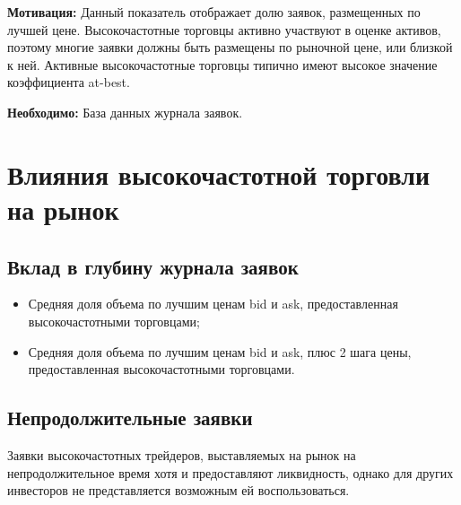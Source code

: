 \documentclass{article}
\begin{document}
		\noindent
		\textbf{Мотивация:} Данный показатель отображает долю заявок, размещенных по лучшей цене. Высокочастотные торговцы активно участвуют в оценке активов, поэтому многие заявки должны быть размещены по рыночной цене, или близкой к ней. Активные высокочастотные торговцы типично имеют высокое значение коэффициента at-best.

		\noindent
		\textbf{Необходимо:} База данных журнала заявок.

\section*{Влияния высокочастотной торговли на рынок}
	
	\subsection*{Вклад в глубину журнала заявок}

		\begin{itemize}
			\item Средняя доля объема по лучшим ценам bid и ask, предоставленная высокочастотными торговцами;
			\item Средняя доля объема по лучшим ценам bid и ask, плюс 2 шага цены, предоставленная высокочастотными торговцами.
		\end{itemize}

	\subsection*{Непродолжительные заявки}

		Заявки высокочастотных трейдеров, выставляемых на рынок на непродолжительное время хотя и предоставляют ликвидность, однако для других инвесторов не представляется возможным ей воспользоваться.
\end{document}
